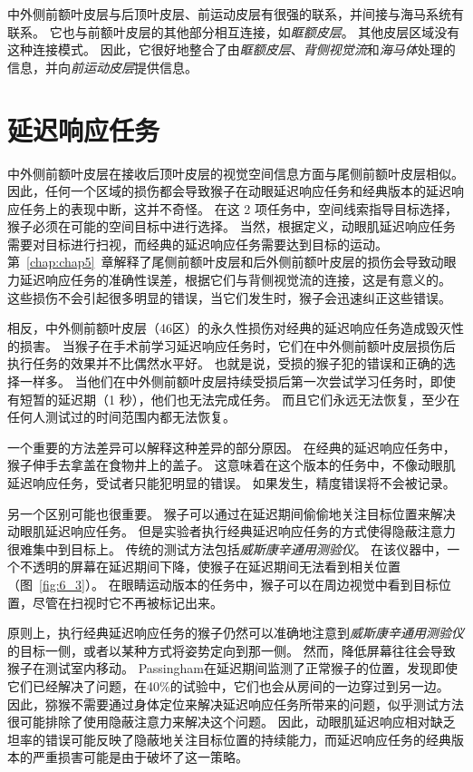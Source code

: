 中外侧前额叶皮层与后顶叶皮层、前运动皮层有很强的联系，并间接与海马系统有联系。
它也与前额叶皮层的其他部分相互连接，如\textit{眶额皮层}。
其他皮层区域没有这种连接模式。
因此，它很好地整合了由\textit{眶额皮层}、\textit{背侧视觉流}和\textit{海马体}处理的信息，并向\textit{前运动皮层}提供信息。



\section{延迟响应任务}

中外侧前额叶皮层在接收后顶叶皮层的视觉空间信息方面与尾侧前额叶皮层相似。
因此，任何一个区域的损伤都会导致猴子在动眼延迟响应任务和经典版本的延迟响应任务上的表现中断，这并不奇怪。
在这 2 项任务中，空间线索指导目标选择，猴子必须在可能的空间目标中进行选择。
当然，根据定义，动眼肌延迟响应任务需要对目标进行扫视，而经典的延迟响应任务需要达到目标的运动。
第~\ref{chap:chap5}~章解释了尾侧前额叶皮层和后外侧前额叶皮层的损伤会导致动眼力延迟响应任务的准确性误差，根据它们与背侧视觉流的连接，这是有意义的。
这些损伤不会引起很多明显的错误，当它们发生时，猴子会迅速纠正这些错误\cite{tsujimoto2012prefrontal}。


相反，中外侧前额叶皮层（46区）的永久性损伤对经典的延迟响应任务造成毁灭性的损害。
当猴子在手术前学习延迟响应任务时，它们在中外侧前额叶皮层损伤后执行任务的效果并不比偶然水平好\cite{goldman1978prenatal}。
也就是说，受损的猴子犯的错误和正确的选择一样多。
当他们在中外侧前额叶皮层持续受损后第一次尝试学习任务时，即使有短暂的延迟期（1 秒），他们也无法完成任务\cite{battig1960comparison}。
而且它们永远无法恢复，至少在任何人测试过的时间范围内都无法恢复。


一个重要的方法差异可以解释这种差异的部分原因。
在经典的延迟响应任务中，猴子伸手去拿盖在食物井上的盖子。
这意味着在这个版本的任务中，不像动眼肌延迟响应任务，受试者只能犯明显的错误。
如果发生，精度错误将不会被记录。


另一个区别可能也很重要。
猴子可以通过在延迟期间偷偷地关注目标位置来解决动眼肌延迟响应任务。
但是实验者执行经典延迟响应任务的方式使得隐蔽注意力很难集中到目标上。
传统的测试方法包括\textit{威斯康辛通用测验仪}。
在该仪器中，一个不透明的屏幕在延迟期间下降，使猴子在延迟期间无法看到相关位置（图~\ref{fig:6_3}）。
在眼睛运动版本的任务中，猴子可以在周边视觉中看到目标位置，尽管在扫视时它不再被标记出来。


原则上，执行经典延迟响应任务的猴子仍然可以准确地注意到\textit{威斯康辛通用测验仪}的目标一侧，或者以某种方式将姿势定向到那一侧。
然而，降低屏幕往往会导致猴子在测试室内移动。
Passingham\cite{passingham1971behavioural}在延迟期间监测了正常猴子的位置，发现即使它们已经解决了问题，在40\%的试验中，它们也会从房间的一边穿过到另一边。
因此，猕猴不需要通过身体定位来解决延迟响应任务所带来的问题，似乎测试方法很可能排除了使用隐蔽注意力来解决这个问题。
因此，动眼肌延迟响应相对缺乏坦率的错误可能反映了隐蔽地关注目标位置的持续能力，而延迟响应任务的经典版本的严重损害可能是由于破坏了这一策略。


